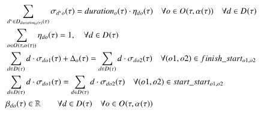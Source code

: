 {\begin{alignat}{2}
		& \sum_{\ElementDays^* \in  \SetDays{\ParDuration}} \VarTacticalWorkBinary{\ElementDays^*}{\ElementOperation}                                                                                                                    = \ParDuration \cdot \VarTacticalWorkBinaryConsecutive                                                                                                                                                                                                        \quad \forall \ElementOperation \in \SetOperation{}{\VarStrategicWorkOrderAssignment{}{}} \quad \forall \ElementDays \in \SetDays{}                                                                                                                                                        \\
		& \sum_{\ElementOperation \in \SetOperation{}{\VarStrategicWorkOrderAssignment{}{}}} \VarTacticalWorkBinaryConsecutive = 1,                                                                                                                                         \quad \forall \ElementDays \in \SetDays{}                                                                                                                                                                                                                                            \notag\\
		& \sum_{\ElementDays \in \SetDays{}} \ElementDays \cdot \VarTacticalWorkBinary{\ElementDays}{\ElementOperation1} + \VarTacticalOperationDifference  = \sum_{\ElementDays \in \SetDays{}} \ElementDays \cdot \VarTacticalWorkBinary{\ElementDays}{\ElementOperation2}  \quad \forall (o1, \ElementOperation2) \in \ParFinishStart                                                                                                                                                                                                                                 \\ 
		& \sum_{\ElementDays \in \SetDays{}} \ElementDays \cdot \VarTacticalWorkBinary{\ElementDays}{\ElementOperation1} = \sum_{\ElementDays \in \SetDays{}} \ElementDays \cdot \VarTacticalWorkBinary{\ElementDays}{\ElementOperation2}                                     \quad \forall (o1, \ElementOperation2) \in \ParStartStart                                                                                                                                                                                                                                  \\ 
		& \VarTacticalWork{\ElementDays}{\ElementOperation} \in \mathbb{R} \quad                                                                                                                                                                                            \quad \forall \ElementDays \in \SetDays{} \quad \forall \ElementOperation \in \SetOperation{}{\VarStrategicWorkOrderAssignment{}{}}                                                                                                                                                        \\

\end{alignat}}
